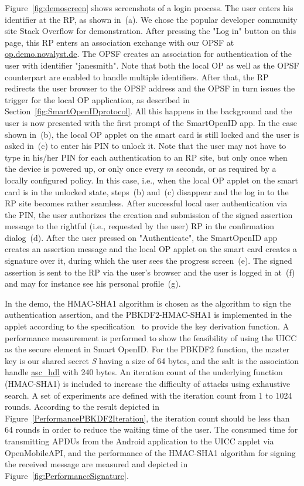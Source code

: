 \documentclass[runningheads,a4paper]{llncs}
\begin{document}
Figure~\ref{fig:demoscreen} shows screenshots of a login process.
The user enters his identifier at the RP, as shown in~(a). We chose the popular developer community site Stack Overflow for demonstration.
After pressing the "Log in" button on this page, this RP enters an association
exchange with our OPSF at \url{op.demo.novalyst.de}. The OPSF creates an association
for authentication of the user with identifier "janesmith". Note that both the 
local OP as well as the OPSF counterpart are enabled to handle multiple identifiers.
After that, the RP redirects the user browser to the OPSF address and the OPSF
in turn issues the trigger for the local OP application,
as described in Section~\ref{fig:SmartOpenIDprotocol}. 
All this happens in the background and the user is now presented with the first
prompt of the SmartOpenID app. In the case shown in~(b), the local OP applet on 
the smart card is still locked and the user is asked in~(c) to enter his PIN
to unlock it. Note that the user may not have to type in his/her PIN for each
authentication to an RP site, but only once when the device is powered up, 
or only once every $m$ seconds, or as required by a locally configured policy.
In this case, i.e., when the local OP applet on the smart card is in the unlocked state, steps~(b) and~(c) disappear and the log in to the RP site becomes rather seamless.
%
After successful local user authentication via the PIN, the user authorizes the creation and submission of the signed assertion message to the rightful (i.e., requested by the user) RP in the confirmation dialog~(d). 
After the user pressed on "Authenticate", the SmartOpenID app creates an assertion message and the local OP applet on the smart card creates a signature over it, during which the user sees the progress screen~(e). The signed assertion is sent to the RP via the user's browser and the user is logged in at~(f) and may for instance see his personal profile~(g).

In the demo, the HMAC-SHA1 algorithm is chosen as the algorithm to sign the authentication assertion, and the PBKDF2-HMAC-SHA1 is implemented in the applet according to the specification~\cite{rfc2898} to provide the key derivation function. 
A performance measurement is performed to show the feasibility of using the UICC as the secure element in Smart OpenID. 
For the PBKDF2 function, the master key is our shared secret \textit{S} having a size of 64 bytes, and the salt is the association handle \url{asc_hdl} with 240 bytes. An iteration count of the underlying function (HMAC-SHA1) is included to increase the difficulty of attacks using exhaustive search. A set of experiments are defined with the iteration count from 1 to 1024 rounds. According to the result depicted in Figure~\ref{PerformancePBKDF2Iteration}, the iteration count should be less than 64 rounds in order to reduce the waiting time of the user. The consumed time for transmitting APDUs from the Android application to the UICC applet via OpenMobileAPI, and the performance of the HMAC-SHA1 algorithm for signing the received message are measured and depicted in Figure~\ref{fig:PerformanceSignature}.
\end{document}
